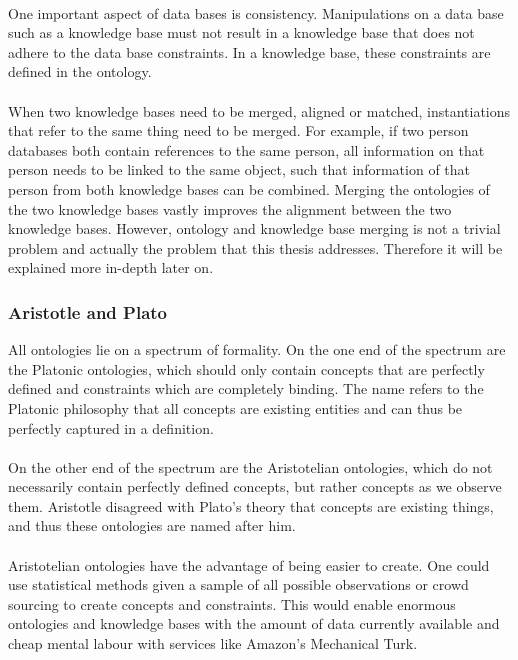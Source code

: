 \documentclass{article}
\begin{document}
 \paragraph{}
 One important aspect of data bases is consistency. Manipulations on a data base such as a knowledge base must not result in a knowledge base that does not adhere to the data base constraints. In a knowledge base, these constraints are defined in the ontology.
 \paragraph{}
 When two knowledge bases need to be merged, aligned or matched, instantiations that refer to the same thing need to be merged. For example, if two person databases both contain references to the same person, all information on that person needs to be linked to the same object, such that information of that person from both knowledge bases can be combined. Merging the ontologies of the two knowledge bases vastly improves the alignment between the two knowledge bases. However, ontology and knowledge base merging is not a trivial problem and actually the problem that this thesis addresses. Therefore it will be explained more in-depth later on\cite{09ontology}.
 \subsubsection{Aristotle and Plato}
 All ontologies lie on a spectrum of formality. On the one end of the spectrum are the Platonic ontologies, which should only contain concepts that are perfectly defined and constraints which are completely binding. The name refers to the Platonic philosophy that all concepts are existing entities and can thus be perfectly captured in a definition.
 \paragraph{}
 On the other end of the spectrum are the Aristotelian ontologies, which do not necessarily contain perfectly defined concepts, but rather concepts as we observe them. Aristotle disagreed with Plato's theory that concepts are existing things, and thus these ontologies are named after him\cite{aristotleplato}.
 \paragraph{}
 Aristotelian ontologies have the advantage of being easier to create. One could use statistical methods given a sample of all possible observations or crowd sourcing to create concepts and constraints. This would enable enormous ontologies and knowledge bases with the amount of data currently available and cheap mental labour with services like Amazon's Mechanical Turk.
\end{document}
